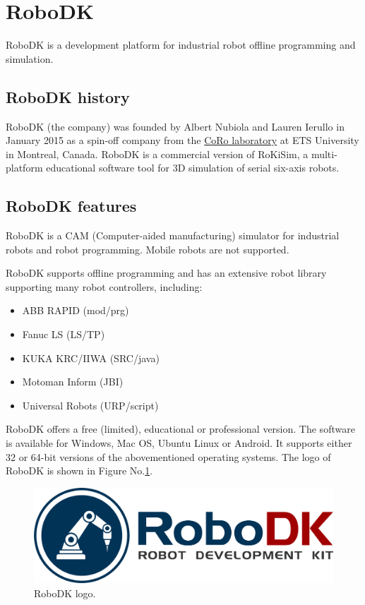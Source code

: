 \section{RoboDK}

RoboDK is a development platform for industrial robot offline programming and simulation.

\subsection{RoboDK history}

RoboDK (the company) was founded by Albert Nubiola and Lauren Ierullo in January 2015 as a spin-off company from the \href{https://en.etsmtl.ca/unites-de-recherche/coro/accueil?lang=en-CA}{CoRo laboratory}   at ETS University in Montreal, Canada. RoboDK is a commercial version of RoKiSim, a multi-platform educational software tool for 3D simulation of serial six-axis robots.

\subsection{RoboDK features}

RoboDK is a CAM (Computer-aided manufacturing) simulator for industrial robots and robot programming. Mobile robots are not supported. 

RoboDK supports offline programming and has an extensive robot library supporting many robot controllers, including:

\begin{itemize}
    \item ABB RAPID (mod/prg)
    \item Fanuc LS (LS/TP)
    \item KUKA KRC/IIWA (SRC/java)
    \item Motoman Inform (JBI)
    \item Universal Robots (URP/script)
\end{itemize}

RoboDK offers a free (limited), educational or professional version. 
The software is available for Windows, Mac OS, Ubuntu Linux or Android. It supports either 32 or 64-bit versions of the abovementioned operating systems. The logo of RoboDK is shown in Figure No.\ref{fig:robodklogo}.

\begin{figure}[htp]
    \centering
    \includegraphics[width=0.9\linewidth]{img/robodk_logo.png}
    \caption{RoboDK logo.}
    \label{fig:robodklogo}
\end{figure}

